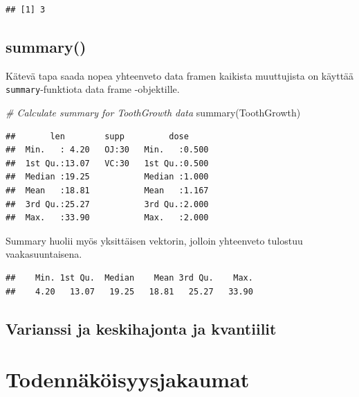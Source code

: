 \documentclass[
]{book}
\newenvironment{Shaded}{\begin{snugshade}}{\end{snugshade}}
\newcommand{\CommentTok}[1]{\textcolor[rgb]{0.56,0.35,0.01}{\textit{#1}}}
\newcommand{\FunctionTok}[1]{\textcolor[rgb]{0.00,0.00,0.00}{#1}}
\newcommand{\NormalTok}[1]{#1}
\newcommand{\OtherTok}[1]{\textcolor[rgb]{0.56,0.35,0.01}{#1}}
\newcommand{\SpecialCharTok}[1]{\textcolor[rgb]{0.00,0.00,0.00}{#1}}
\begin{document}
\begin{verbatim}
## [1] 3
\end{verbatim}

\hypertarget{summary}{%
\section{summary()}\label{summary}}

Kätevä tapa saada nopea yhteenveto data framen kaikista muuttujista on käyttää \texttt{summary}-funktiota data frame -objektille.

\begin{Shaded}
\begin{Highlighting}[]
\CommentTok{\# Calculate summary for ToothGrowth data}
\FunctionTok{summary}\NormalTok{(ToothGrowth)}
\end{Highlighting}
\end{Shaded}

\begin{verbatim}
##       len        supp         dose      
##  Min.   : 4.20   OJ:30   Min.   :0.500  
##  1st Qu.:13.07   VC:30   1st Qu.:0.500  
##  Median :19.25           Median :1.000  
##  Mean   :18.81           Mean   :1.167  
##  3rd Qu.:25.27           3rd Qu.:2.000  
##  Max.   :33.90           Max.   :2.000
\end{verbatim}

Summary huolii myös yksittäisen vektorin, jolloin yhteenveto tulostuu vaakasuuntaisena.

\begin{Shaded}
\end{Shaded}

\begin{verbatim}
##    Min. 1st Qu.  Median    Mean 3rd Qu.    Max. 
##    4.20   13.07   19.25   18.81   25.27   33.90
\end{verbatim}

\hypertarget{varianssi-ja-keskihajonta-ja-kvantiilit}{%
\section{Varianssi ja keskihajonta ja kvantiilit}\label{varianssi-ja-keskihajonta-ja-kvantiilit}}

\hypertarget{distributions}{%
\chapter{Todennäköisyysjakaumat}\label{distributions}}
\end{document}

